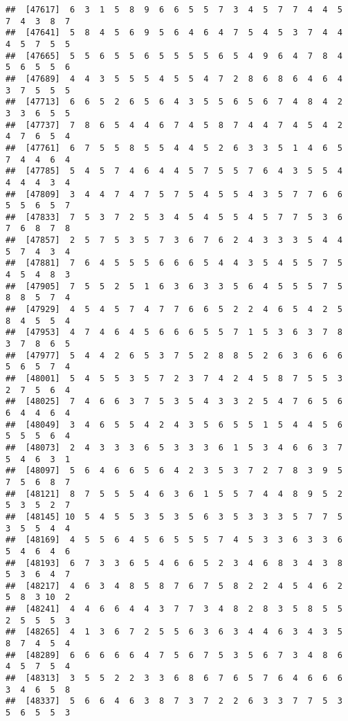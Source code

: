 \documentclass[
]{book}
\begin{document}
\begin{verbatim}
##  [47617]  6  3  1  5  8  9  6  6  5  5  7  3  4  5  7  7  4  4  5  7  4  3  8  7
##  [47641]  5  8  4  5  6  9  5  6  4  6  4  7  5  4  5  3  7  4  4  4  5  7  5  5
##  [47665]  5  5  6  5  5  6  5  5  5  5  6  5  4  9  6  4  7  8  4  5  6  5  5  6
##  [47689]  4  4  3  5  5  5  4  5  5  4  7  2  8  6  8  6  4  6  4  3  7  5  5  5
##  [47713]  6  6  5  2  6  5  6  4  3  5  5  6  5  6  7  4  8  4  2  3  3  6  5  5
##  [47737]  7  8  6  5  4  4  6  7  4  5  8  7  4  4  7  4  5  4  2  4  7  6  5  4
##  [47761]  6  7  5  5  8  5  5  4  4  5  2  6  3  3  5  1  4  6  5  7  4  4  6  4
##  [47785]  5  4  5  7  4  6  4  4  5  7  5  5  7  6  4  3  5  5  4  4  4  4  3  4
##  [47809]  3  4  4  7  4  7  5  7  5  4  5  5  4  3  5  7  7  6  6  5  5  6  5  7
##  [47833]  7  5  3  7  2  5  3  4  5  4  5  5  4  5  7  7  5  3  6  7  6  8  7  8
##  [47857]  2  5  7  5  3  5  7  3  6  7  6  2  4  3  3  3  5  4  4  5  7  4  3  4
##  [47881]  7  6  4  5  5  5  6  6  6  5  4  4  3  5  4  5  5  7  5  4  5  4  8  3
##  [47905]  7  5  5  2  5  1  6  3  6  3  3  5  6  4  5  5  5  7  5  8  8  5  7  4
##  [47929]  4  5  4  5  7  4  7  7  6  6  5  2  2  4  6  5  4  2  5  8  4  5  5  4
##  [47953]  4  7  4  6  4  5  6  6  6  5  5  7  1  5  3  6  3  7  8  3  7  8  6  5
##  [47977]  5  4  4  2  6  5  3  7  5  2  8  8  5  2  6  3  6  6  6  5  6  5  7  4
##  [48001]  5  4  5  5  3  5  7  2  3  7  4  2  4  5  8  7  5  5  3  2  7  5  6  4
##  [48025]  7  4  6  6  3  7  5  3  5  4  3  3  2  5  4  7  6  5  6  6  4  4  6  4
##  [48049]  3  4  6  5  5  4  2  4  3  5  6  5  5  1  5  4  4  5  6  5  5  5  6  4
##  [48073]  2  4  3  3  3  6  5  3  3  3  6  1  5  3  4  6  6  3  7  5  4  6  3  1
##  [48097]  5  6  4  6  6  5  6  4  2  3  5  3  7  2  7  8  3  9  5  7  5  6  8  7
##  [48121]  8  7  5  5  5  4  6  3  6  1  5  5  7  4  4  8  9  5  2  5  3  5  2  7
##  [48145] 10  5  4  5  5  3  5  3  5  6  3  5  3  3  3  5  7  7  5  3  5  5  4  4
##  [48169]  4  5  5  6  4  5  6  5  5  5  7  4  5  3  3  6  3  3  6  5  4  6  4  6
##  [48193]  6  7  3  3  6  5  4  6  6  5  2  3  4  6  8  3  4  3  8  5  3  6  4  7
##  [48217]  4  6  3  4  8  5  8  7  6  7  5  8  2  2  4  5  4  6  2  5  8  3 10  2
##  [48241]  4  4  6  6  4  4  3  7  7  3  4  8  2  8  3  5  8  5  5  2  5  5  5  3
##  [48265]  4  1  3  6  7  2  5  5  6  3  6  3  4  4  6  3  4  3  5  8  7  4  5  4
##  [48289]  6  6  6  6  6  4  7  5  6  7  5  3  5  6  7  3  4  8  6  4  5  7  5  4
##  [48313]  3  5  5  2  2  3  3  6  8  6  7  6  5  7  6  4  6  6  6  3  4  6  5  8
##  [48337]  5  6  6  4  6  3  8  7  3  7  2  2  6  3  3  7  7  5  3  5  6  5  5  3

\end{verbatim}
\end{document}

